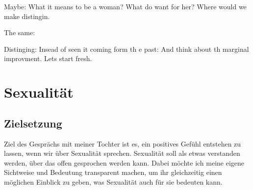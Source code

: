 Maybe: What it means to be a woman?
What do want for her? Where would we make distingin.


The same:

Distinging:
Insead of seen it coming form th e past: And think about th marginal improvment. Lets start fresh.

\section{Sexualität}

\subsection{Zielsetzung}

Ziel des Gesprächs mit meiner Tochter ist es, ein positives Gefühl entstehen zu lassen, wenn wir über Sexualität sprechen. Sexualität soll als etwas verstanden werden, über das offen gesprochen werden kann. Dabei möchte ich meine eigene Sichtweise und Bedeutung transparent machen, um ihr gleichzeitig einen möglichen Einblick zu geben, was Sexualität auch für sie bedeuten kann.

